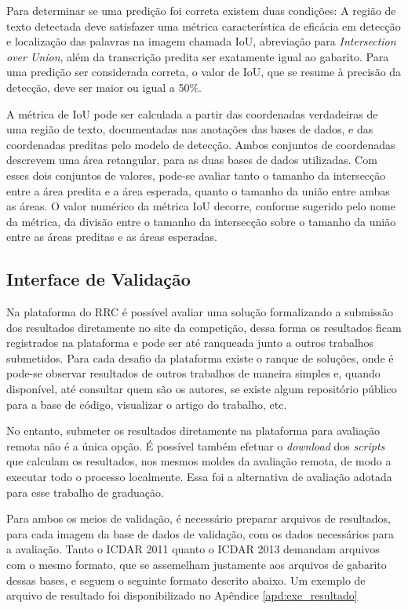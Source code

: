 Para determinar se uma predição foi correta existem duas condições: A região de texto detectada deve satisfazer uma métrica característica de 
eficácia em detecção e localização das palavras na imagem chamada IoU, abreviação para \textit{Intersection over Union}, além da transcrição 
predita ser exatamente igual ao gabarito. Para uma predição ser considerada correta, o valor de IoU, que se resume à precisão da detecção, deve 
ser maior ou igual a 50\%.

A métrica de IoU pode ser calculada a partir das coordenadas verdadeiras de uma região de texto, documentadas nas anotações das bases de dados, 
e das coordenadas preditas pelo modelo de detecção. Ambos conjuntos de coordenadas descrevem uma área retangular, para as duas bases de dados 
utilizadas. Com esses dois conjuntos de valores, pode-se avaliar tanto o tamanho da intersecção entre a área predita e a área esperada, quanto o 
tamanho da união entre ambas as áreas. O valor numérico da métrica IoU decorre, conforme sugerido pelo nome da métrica, da divisão entre o 
tamanho da intersecção sobre o tamanho da união entre as áreas preditas e as áreas esperadas.

\subsection{Interface de Validação}\label{sec:methodology_validation_interface}
Na plataforma do RRC é possível avaliar uma solução formalizando a submissão dos resultados diretamente no site da competição, dessa forma os 
resultados ficam registrados na plataforma e pode ser até ranqueada junto a outros trabalhos submetidos. Para cada desafio da plataforma existe 
o ranque de soluções, onde é pode-se observar resultados de outros trabalhos de maneira simples e, quando disponível, até consultar quem são os 
autores, se existe algum repositório público para a base de código, visualizar o artigo do trabalho, etc.

No entanto, submeter os resultados diretamente na plataforma para avaliação remota não é a única opção. É possível também efetuar o \textit{download} 
dos \textit{scripts} que calculam os resultados, nos mesmos moldes da avaliação remota, de modo a executar todo o processo localmente. Essa 
foi a alternativa de avaliação adotada para esse trabalho de graduação.

Para ambos os meios de validação, é necessário preparar arquivos de resultados, para cada imagem da base de dados de validação, com os dados 
necessários para a avaliação. Tanto o ICDAR 2011 quanto o ICDAR 2013 demandam arquivos com o mesmo formato, que se assemelham justamente aos 
arquivos de gabarito dessas bases, e seguem o seguinte formato descrito abaixo. Um exemplo de arquivo de resultado foi disponibilizado no 
Apêndice \ref{apd:exe_resultado}

